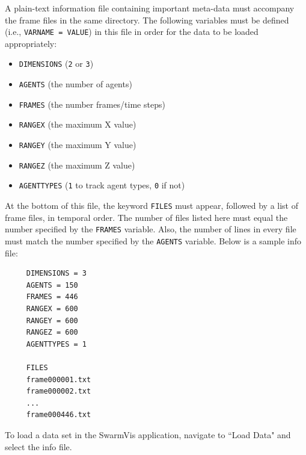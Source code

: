 \documentclass[conference]{IEEEtran}
\begin{document}
A plain-text information file containing important meta-data must accompany the frame files in the same directory.
The following variables must be defined (i.e., \texttt{VARNAME = VALUE}) in this file in order for the data to be loaded appropriately:
\begin{itemize}
\item \texttt{DIMENSIONS} (\texttt{2} or \texttt{3})
\item \texttt{AGENTS} (the number of agents)
\item \texttt{FRAMES} (the number frames/time steps)
\item \texttt{RANGEX} (the maximum X value)
\item \texttt{RANGEY} (the maximum Y value)
\item \texttt{RANGEZ} (the maximum Z value)
\item \texttt{AGENTTYPES} (\texttt{1} to track agent types, \texttt{0} if not)
\end{itemize}
At the bottom of this file, the keyword \texttt{FILES} must appear, followed by a list of frame files, in temporal order. The number
of files listed here must equal the number specified by the \texttt{FRAMES} variable. Also,
the number of lines in every file must match the number specified by the \texttt{AGENTS} variable. Below is a sample info file:
\begin{verbatim}
     DIMENSIONS = 3
     AGENTS = 150
     FRAMES = 446
     RANGEX = 600
     RANGEY = 600
     RANGEZ = 600
     AGENTTYPES = 1

     FILES
     frame000001.txt
     frame000002.txt
     ...
     frame000446.txt
\end{verbatim}

To load a data set in the SwarmVis application, navigate to ``Load Data" and select the info file.
\end{document}
